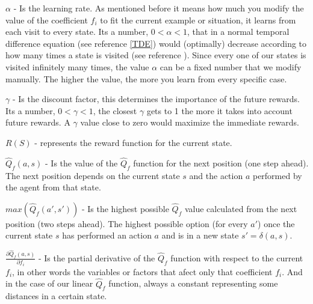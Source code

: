 \begin{flushleft}
$\alpha$  - Is the learning rate. As mentioned before it means how much you modify the value of the coefficient $f_i$ to fit the current example or situation, it learns from each visit to every state. Its a number, $0 < \alpha < 1$, that in a normal temporal difference equation  (see reference \ref{TDE}) would (optimally) decrease according to how many times a state is visited  (see reference \cite{rl}). Since every one of our states is visited infinitely many times, the value $\alpha$ can be a fixed number that we modify manually. The higher the value, the more you learn from every specific case.
\end{flushleft} 

\begin{flushleft}
$\gamma$  - Is the discount factor, this determines the importance of the future rewards. Its a number, $0 < \gamma < 1$, the closest $\gamma$ gets to 1 the more it takes into account future rewards. A $\gamma$ value close to zero would maximize the immediate rewards. 
\end{flushleft} 

\begin{flushleft}
$R(S)$ -  represents the reward function for the current state.
\end{flushleft} 

\begin{flushleft}
$\hat{Q}_f(a,s)$ - Is the value of the $\hat{Q}_f$ function for the next position (one step ahead). The next position depends on the current state $s$ and the action $a$ performed by the agent from that state.
\end{flushleft} 

\begin{flushleft}
$max(\hat{Q}_f(a',s'))$ - Is the highest possible $\hat{Q}_f$ value calculated from the next position (two steps ahead). The highest possible option (for every $a'$) once the current state $s$ has performed an action $a$ and is in a new state $s' = \delta(a,s)$. 
\end{flushleft} 

\begin{flushleft}
$\frac{\partial \hat{Q}_f(a,s)}{\partial f_i}$  - Is the partial derivative of the $\hat{Q}_f$ function with respect to the current $f_i$, in other words the variables or factors that afect only that coefficient $f_i$. And in the case of our  linear $\hat{Q}_f$ function, always a constant representing some distances in a certain state. 
\end{flushleft} 

